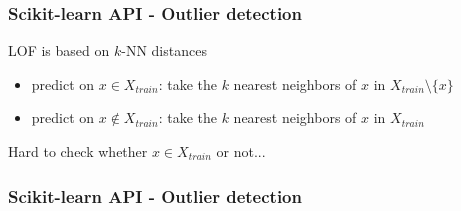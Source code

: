 \documentclass[slidetop,11pt]{beamer}
\begin{document}
\begin{frame}\frametitle{Scikit-learn API - Outlier detection}

LOF is based on $k$-NN distances

\vspace{0.5cm}

\begin{itemize}
  \item predict on $x \in X_{train}$: take the $k$ nearest neighbors of $x$ in $X_{train} \setminus \{x\}$
  \vspace{0.5cm}
  \item predict on $x \notin X_{train}$: take the $k$ nearest neighbors of $x$ in $X_{train}$
\end{itemize}

\vspace{0.5cm}

\begin{center}
Hard to check whether $x \in X_{train}$ or not...
\end{center}

\end{frame}


\begin{frame}\frametitle{Scikit-learn API - Outlier detection}





\end{frame}
\end{document}
